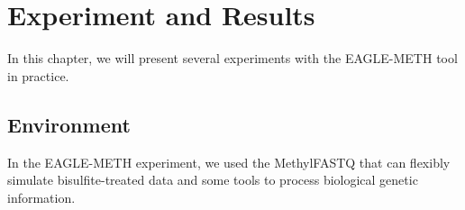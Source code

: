 \documentclass{PHlab-thesis}
\begin{document}






	
\chapter{Experiment and Results}
In this chapter, we will present several experiments with the EAGLE-METH tool in practice.
\section{Environment}
In the EAGLE-METH experiment, we used the MethylFASTQ that can flexibly simulate bisulfite-treated data and some tools to process biological genetic information.
\end{document}
